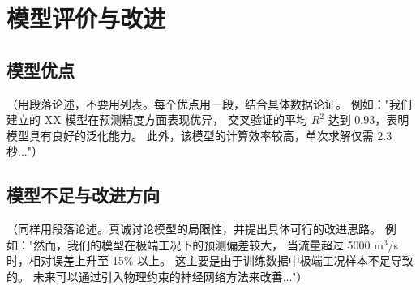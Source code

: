 \section{模型评价与改进}

\subsection{模型优点}

（用段落论述，不要用列表。每个优点用一段，结合具体数据论证。
例如："我们建立的 XX 模型在预测精度方面表现优异，
交叉验证的平均 $R^2$ 达到 0.93，表明模型具有良好的泛化能力。
此外，该模型的计算效率较高，单次求解仅需 2.3 秒..."）

\subsection{模型不足与改进方向}

（同样用段落论述。真诚讨论模型的局限性，并提出具体可行的改进思路。
例如："然而，我们的模型在极端工况下的预测偏差较大，
当流量超过 5000 m$^3$/s 时，相对误差上升至 15\% 以上。
这主要是由于训练数据中极端工况样本不足导致的。
未来可以通过引入物理约束的神经网络方法来改善..."）
